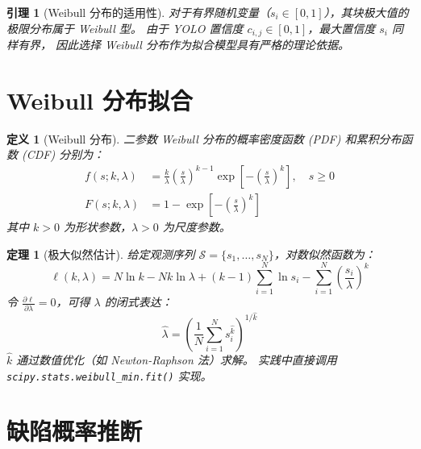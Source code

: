 \documentclass[12pt, a4paper]{ctexart}
\newtheorem{definition}{定义}[section]
\newtheorem{theorem}{定理}[section]
\newtheorem{lemma}{引理}[section]
\begin{document}
\begin{lemma}[Weibull 分布的适用性]
\label{lem:weibull_choice}
对于有界随机变量（$s_i \in [0, 1]$），其块极大值的极限分布属于 Weibull 型。
由于 YOLO 置信度 $c_{i,j} \in [0, 1]$，最大置信度 $s_i$ 同样有界，
因此选择 Weibull 分布作为拟合模型具有严格的理论依据。
\end{lemma}

\section{Weibull 分布拟合}

\begin{definition}[Weibull 分布]
\label{def:weibull}
二参数 Weibull 分布的概率密度函数 (PDF) 和累积分布函数 (CDF) 分别为：
\begin{align}
    f(s; k, \lambda) &= \frac{k}{\lambda} \left(\frac{s}{\lambda}\right)^{k-1}
    \exp\!\left[-\left(\frac{s}{\lambda}\right)^{k}\right], \quad s \geq 0
    \label{eq:weibull_pdf} \\[6pt]
    F(s; k, \lambda) &= 1 - \exp\!\left[-\left(\frac{s}{\lambda}\right)^{k}\right]
    \label{eq:weibull_cdf}
\end{align}
其中 $k > 0$ 为形状参数，$\lambda > 0$ 为尺度参数。
\end{definition}

\begin{theorem}[极大似然估计]
给定观测序列 $\mathcal{S} = \{s_1, \ldots, s_N\}$，对数似然函数为：
\begin{equation}
    \ell(k, \lambda) = N \ln k - Nk \ln \lambda + (k-1) \sum_{i=1}^{N} \ln s_i
    - \sum_{i=1}^{N} \left(\frac{s_i}{\lambda}\right)^{k}
    \label{eq:log_likelihood}
\end{equation}
令 $\frac{\partial \ell}{\partial \lambda} = 0$，可得 $\lambda$ 的闭式表达：
\begin{equation}
    \hat{\lambda} = \left(\frac{1}{N} \sum_{i=1}^{N} s_i^{\hat{k}}\right)^{1/\hat{k}}
    \label{eq:lambda_hat}
\end{equation}
$\hat{k}$ 通过数值优化（如 Newton-Raphson 法）求解。
实践中直接调用 \texttt{scipy.stats.weibull\_min.fit()} 实现。
\end{theorem}

\section{缺陷概率推断}
\end{document}
